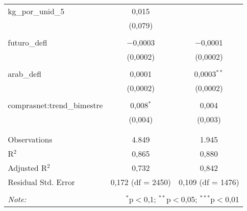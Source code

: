 \begin{table}[!htbp]
\begin{tabular}{@{\extracolsep{5pt}}lcc}
 kg\_por\_unid\_5 & 0,015 &  \\ 
  & (0,079) &  \\ 
  & & \\ 
 futuro\_defl & $-$0,0003 & $-$0,0001 \\ 
  & (0,0002) & (0,0002) \\ 
  & & \\ 
 arab\_defl & 0,0001 & 0,0003$^{**}$ \\ 
  & (0,0002) & (0,0002) \\ 
  & & \\ 
 comprasnet:trend\_bimestre & 0,008$^{*}$ & 0,004 \\ 
  & (0,004) & (0,003) \\ 
  & & \\ 
\hline \\[-1.8ex] 
Observations & 4.849 & 1.945 \\ 
R$^{2}$ & 0,865 & 0,880 \\ 
Adjusted R$^{2}$ & 0,732 & 0,842 \\ 
Residual Std. Error & 0,172 (df = 2450) & 0,109 (df = 1476) \\ 
\hline 
\hline \\[-1.8ex] 
\textit{Note:}  & \multicolumn{2}{r}{$^{*}$p$<$0,1; $^{**}$p$<$0,05; $^{***}$p$<$0,01} \\ 
\end{tabular} 
\end{table} 
